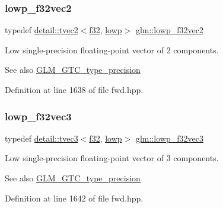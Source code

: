 \subsubsection{\texorpdfstring{lowp\+\_\+f32vec2}{lowp\_f32vec2}}
{\footnotesize\ttfamily typedef \hyperlink{structglm_1_1detail_1_1tvec2}{detail\+::tvec2}$<$\hyperlink{group__gtc__type__precision_ga0ec999b57f5330d9021256e96038df04}{f32}, \hyperlink{namespaceglm_a0f04f086094c747d227af4425893f545ae161af3fc695e696ce3bf69f7332bc2d}{lowp}$>$ \hyperlink{group__gtc__type__precision_ga7faa2c9884c87b1e6512a966adad69e4}{glm\+::lowp\+\_\+f32vec2}}

Low single-\/precision floating-\/point vector of 2 components. \begin{DoxySeeAlso}{See also}
\hyperlink{group__gtc__type__precision}{G\+L\+M\+\_\+\+G\+T\+C\+\_\+type\+\_\+precision} 
\end{DoxySeeAlso}


Definition at line 1638 of file fwd.\+hpp.

\mbox{\label{group__gtc__type__precision_ga1f878d91a5f5ab92c756244b62af7248}} 
\subsubsection{\texorpdfstring{lowp\+\_\+f32vec3}{lowp\_f32vec3}}
{\footnotesize\ttfamily typedef \hyperlink{structglm_1_1detail_1_1tvec3}{detail\+::tvec3}$<$\hyperlink{group__gtc__type__precision_ga0ec999b57f5330d9021256e96038df04}{f32}, \hyperlink{namespaceglm_a0f04f086094c747d227af4425893f545ae161af3fc695e696ce3bf69f7332bc2d}{lowp}$>$ \hyperlink{group__gtc__type__precision_ga1f878d91a5f5ab92c756244b62af7248}{glm\+::lowp\+\_\+f32vec3}}

Low single-\/precision floating-\/point vector of 3 components. \begin{DoxySeeAlso}{See also}
\hyperlink{group__gtc__type__precision}{G\+L\+M\+\_\+\+G\+T\+C\+\_\+type\+\_\+precision} 
\end{DoxySeeAlso}


Definition at line 1642 of file fwd.\+hpp.

\mbox{\label{group__gtc__type__precision_ga59f7292d7ed0b7df72e6aa31010e2648}} 
